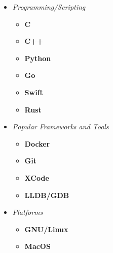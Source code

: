 \documentclass[12]{Resume}
\begin{document}
\begin{itemize}[noitemsep,nolistsep,leftmargin=*]
\setlength\itemsep{-1em}
\item[]\textit{Programming/Scripting}
        \vspace{-1em}
        \begin{multicols}{2}
        \begin{itemize}[leftmargin=*]
        \setlength\itemsep{-0.25em}
            \item[]\textbf{C}\hspace{48pt}
            \item[]\textbf{C++}\hspace{37pt}
            \item[]\textbf{Python}\hspace{25pt}
            \item[]\textbf{Go}\hspace{42pt}
            \item[]\textbf{Swift}\hspace{33pt}
            \item[]\textbf{Rust}\hspace{35.5pt}
        \end{itemize}
        \end{multicols}

\item[]\textit{Popular Frameworks and Tools}
        \vspace{-1em}
        \begin{multicols}{2}
        \begin{itemize}[leftmargin=*]
        \setlength\itemsep{-0.25em}
            \item[]\textbf{Docker}\hspace{25pt}
            \item[]\textbf{Git}\hspace{42pt}
            \item[]\textbf{XCode}\hspace{27pt}
            \item[]\textbf{LLDB/GDB}\hspace{5pt}
        \end{itemize}
        \end{multicols}

\item[]\textit{Platforms}
        \vspace{-1em}
        \begin{multicols}{2}
        \begin{itemize}[leftmargin=*]
        \setlength\itemsep{-0.25em}
        \item[]\textbf{GNU/Linux}\hspace{5pt}
        \item[]\textbf{MacOS}\hspace{25pt}
        \end{itemize}
        \end{multicols}
\end{itemize}
\end{document}
